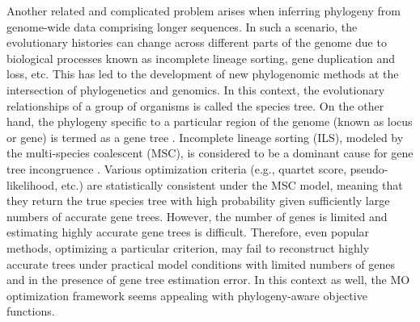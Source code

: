 Another related and complicated problem arises when inferring phylogeny from genome-wide data comprising longer sequences. In such a scenario, the evolutionary histories can change across different parts of the genome due to biological processes known as incomplete lineage sorting, gene duplication and loss, etc. This has led to the development of new phylogenomic methods at the intersection of phylogenetics and genomics. In this context, the evolutionary relationships of a group of organisms is called the species tree. On the other hand, the phylogeny specific to a particular region of the genome (known as locus or gene) is termed as a gene tree \cite{maddison1997gene}. Incomplete lineage sorting (ILS), modeled by the multi-species coalescent (MSC), is considered to be a dominant cause for gene tree incongruence \cite{mirarab2014evaluating, statistical-binning}. Various optimization criteria (e.g., quartet score, pseudo-likelihood, etc.) are statistically consistent under the MSC model, meaning that they return the true species tree with high probability given sufficiently large numbers of accurate gene trees. However, the number of genes is limited and estimating highly accurate gene trees is difficult. Therefore, even popular methods, optimizing a particular criterion, may fail to reconstruct highly accurate trees under practical model conditions with limited numbers of genes and in the presence of gene tree estimation error. In this context as well, the MO optimization framework seems appealing with phylogeny-aware objective functions.

